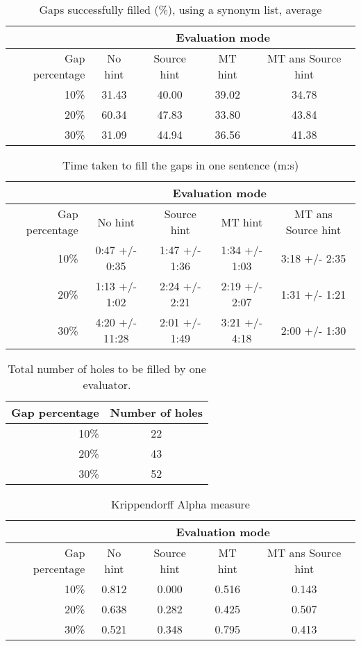 \documentclass[11pt, oneside]{article}   	%
\begin{document}
\begin{table}
\centering
\begin{tabular}{|r |*{4}{c}|}
\hline
 &\multicolumn{4}{c|}{Evaluation mode}\\
\hline
Gap percentage & No hint & Source hint & MT hint & MT ans Source hint\\
\hline
10\%&31.43&40.00&39.02&34.78\\
20\%&60.34&47.83&33.80&43.84\\
30\%&31.09&44.94&36.56&41.38\\
\hline
\end{tabular}
\caption {Gaps successfully filled (\%), using a synonym list, average} \label{tab:title} 
\end{table}

\begin{table}
\centering
\begin{tabular}{|r |*{4}{c}|}
\hline
 &\multicolumn{4}{c|}{Evaluation mode}\\
\hline
Gap percentage & No hint & Source hint & MT hint & MT ans Source hint\\
\hline
10\%&0:47 +/- 0:35&1:47 +/- 1:36&1:34 +/- 1:03&3:18 +/- 2:35\\
20\%&1:13 +/- 1:02&2:24 +/- 2:21&2:19 +/- 2:07&1:31 +/- 1:21\\
30\%&4:20 +/- 11:28&2:01 +/- 1:49&3:21 +/- 4:18&2:00 +/- 1:30\\
\hline
\end{tabular}
\caption {Time taken to fill the gaps in one sentence (m:s)} \label{tab:title} 
\end{table}

\begin{table}
\centering
\begin{tabular}{|r |*{1}{c}|}
\hline
Gap percentage & Number of holes\\
\hline
10\%&22\\
20\%&43\\
30\%&52\\
\hline
\end{tabular}
\caption {Total number of holes to be filled by one evaluator.} \label{tab:title}
\end{table}

\begin{table}
\centering
\begin{tabular}{|r |*{4}{c}|}
\hline
 &\multicolumn{4}{c|}{Evaluation mode}\\
\hline
Gap percentage & No hint & Source hint & MT hint & MT ans Source hint\\
\hline
10\%&0.812&0.000&0.516&0.143\\
20\%&0.638&0.282&0.425&0.507\\
30\%&0.521&0.348&0.795&0.413\\
\hline
\end{tabular}
\caption {Krippendorff Alpha measure} \label{tab:title}
\end{table}
\end{document}
